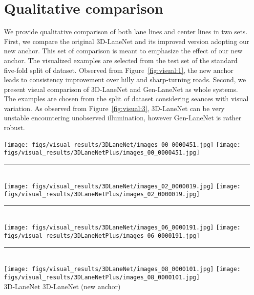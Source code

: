 \documentclass[10pt,twocolumn,letterpaper]{article}
\newcommand{\HRule}{\rule{0.8\textwidth}{0.2mm}}
\begin{document}
\section{Qualitative comparison}
\label{sec:visual:results}

We provide qualitative comparison of both lane lines and center lines in two sets. First, we compare the original 3D-LaneNet and its improved version adopting our new anchor. This set of comparison is meant to emphasize the effect of our new anchor. The visualized examples are selected from the test set of the standard five-fold split of dataset. Observed from Figure~\ref{fig:visual:1}, the new anchor leads to consistency improvement over hilly and sharp-turning roads. Second, we present visual comparison of 3D-LaneNet and Gen-LaneNet as whole systems. The examples are chosen from the split of dataset considering seances with visual variation. As observed from Figure~\ref{fig:visual:3}, 3D-LaneNet can be very unstable encountering unobserved illumination, however Gen-LaneNet is rather robust.

\begin{figure*}[!h]
  \centering
  \texttt{[image: figs/visual\_results/3DLaneNet/images\_00\_0000451.jpg]} \hspace{1cm}
  \texttt{[image: figs/visual\_results/3DLaneNetPlus/images\_00\_0000451.jpg]}
  \HRule\\
  \texttt{[image: figs/visual\_results/3DLaneNet/images\_02\_0000019.jpg]} \hspace{1cm}
  \texttt{[image: figs/visual\_results/3DLaneNetPlus/images\_02\_0000019.jpg]}
  \HRule\\
\texttt{[image: figs/visual\_results/3DLaneNet/images\_06\_0000191.jpg]} \hspace{1cm}
  \texttt{[image: figs/visual\_results/3DLaneNetPlus/images\_06\_0000191.jpg]}
  \HRule\\
  \texttt{[image: figs/visual\_results/3DLaneNet/images\_08\_0000101.jpg]} \hspace{1cm}
  \texttt{[image: figs/visual\_results/3DLaneNetPlus/images\_08\_0000101.jpg]}\\
    \hspace{15pt} 3D-LaneNet  \hspace{80pt} 3D-LaneNet (new anchor)
\caption{\textbf{Effect of the new anchor}. Predicted lanes from 3D-LaneNet and from the extended version with our new anchor are visually compared. Examples are chosen from the test set given the standard five-fold split of the whole dataset. Observe that adopting our new anchor consistently improves the localization of laneline and in turn leads better prediction. For each example, we show image results on the left and 3D results on the right, lane line results in the top row, and center line results in the bottom row. We color the ground-truth lanes in blue and the predicted lanes in red. While the purple lanes are missed detections and the cyan lanes are false alarms.}
  \label{fig:visual:1}
\end{figure*}
\end{document}
